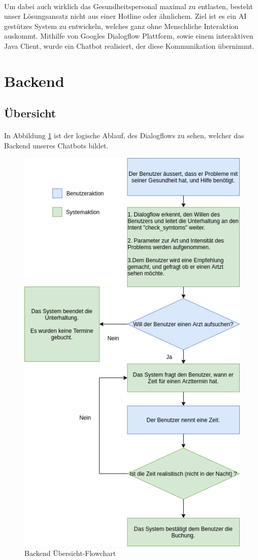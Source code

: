 \documentclass[11pt,a4paper]{article}
\begin{document}
        \paragraph{}
            Um dabei auch wirklich das Gesundheitspersonal maximal zu entlasten, besteht unser
            Lösungsansatz nicht aus einer Hotline oder ähnlichem. Ziel ist es ein AI gestützes System zu
            entwickeln, welches ganz ohne Menschliche Interaktion auskommt. Mithilfe von
            Googles Dialogflow Plattform, sowie einem interaktiven Java Client, wurde ein Chatbot
            realisiert, der diese Kommunikation übernimmt.


\newpage


\section{Backend}
    \subsection{Übersicht}
        \paragraph{}
        In Abbildung \ref{fig:backEndFlowChart} ist der logische Ablauf, des Dialogflows zu sehen, welcher das
        Backend unseres Chatbots bildet.
        \begin{figure}[h!]
            \begin{center}
                \includegraphics[width=0.65\linewidth]{backendOverview.png}
                \caption{Backend Übersicht-Flowchart}
                \label{fig:backEndFlowChart}
            \end{center}
        \end{figure}
\end{document}
